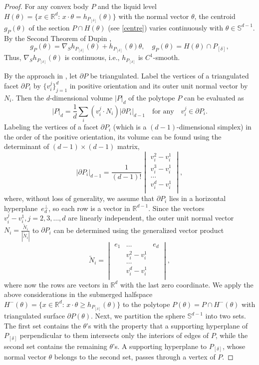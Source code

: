 \documentclass[12pt,letterpaper,reqno]{amsart}
\begin{document}
\begin{proof}
For any convex body $P$ and the liquid level $H(\theta) = \{x \in \mathbb{R}^d: \, x \cdot \theta = h_{P_{[\delta]}}(\theta)\}$ with the normal vector $\theta$, the centroid  $g_P(\theta)$ of the section $P \cap H(\theta)$ (see \eqref{centre}) varies continuously with $\theta \in \mathbb{S}^{d-1}$. By the Second Theorem of Dupin \cite[p.~287]{VP}, 
$$g_P(\theta)=\nabla_S h_{P_{[\delta]}}(\theta) + h_{P_{[\delta]}}(\theta) \theta, \quad g_P(\theta) = H(\theta) \cap P_{[\delta]},$$ 
Thus, $\nabla_S h_{P_{[\delta]}}(\theta)$ is continuous, i.e., $h_{P_{[\delta]}}$ is $C^1$-smooth.


By the approach in \cite{Nu}, let $\partial P$ be triangulated. 
Label the vertices of a triangulated facet $\partial P_i$ by 
$\{v_i^j\}_{j=1}^{d}$ in positive orientation and its outer unit normal vector by $N_i$. 
Then the $d$-dimensional volume $|P|_d$ of the polytope $P$ can be evaluated as
\begin{equation}\label{vol}
|P|_d = 
\frac 1 d \sum_i (v_i^j \cdot N_i) |\partial P_i|_{d-1} \quad \text{for any} \quad v_i^j \in \partial P_i.
\end{equation}
Labeling the vertices of a facet $\partial P_i$ (which is a $(d-1)$-dimensional simplex) in the order of the positive orientation, its volume can be found using the determinant of $(d-1) \times (d-1)$ matrix,
$$
|\partial P_i|_{d-1} = \frac{1}{(d-1)!} \begin{vmatrix}
     v_i^{2} - v_i^1\\ 
     v_i^{3}- v_i^1\\
     \ldots\\
     v_i^{d}- v_i^1\\
\end{vmatrix},
$$
where, without loss of generality, we assume that $\partial P_i$ lies in a horizontal hyperplane~$e_d^\perp$, so each row is a vector in $\mathbb{R}^{d-1}$. 
Since the vectors $ v_i^j-v_i^1, j=2,3,\ldots,d$ are linearly independent, the outer unit normal vector $N_i = \frac{\widetilde{N}_i}{|\widetilde{N}_i|}$ to $\partial P_i$ can be determined using the generalized vector product 
$$
\widetilde{N}_i = 
\begin{vmatrix}
     e_1 & \ldots & e_{d}\\ 
     &v_i^{2}- v_i^1\\
     &\ldots\\
     &v_i^{d}- v_i^1\\
\end{vmatrix},
$$
where now the rows are vectors in $\mathbb{R}^d$ with the last zero coordinate.
We apply the above considerations in the submerged halfspace $H^-(\theta)=\{x \in \mathbb{R}^d: \, x \cdot \theta \geq h_{P_{[\delta]}}(\theta)\}$ to the polytope $P(\theta)=P \cap H^-(\theta)$ with triangulated surface $\partial P(\theta)$. Next, we partition the sphere $\mathbb{S}^{d-1}$ into two sets. The first set contains the $\theta$'s with the property that a supporting hyperplane of $P_{[\delta]}$ perpendicular to them intersects only the interiors of edges of $P$, while the second set contains the remaining $\theta$'s. A supporting hyperplane to $P_{[\delta]}$, whose normal vector $\theta$ belongs to the second set, passes through a vertex of $P$.
 

\end{proof}
\end{document}
